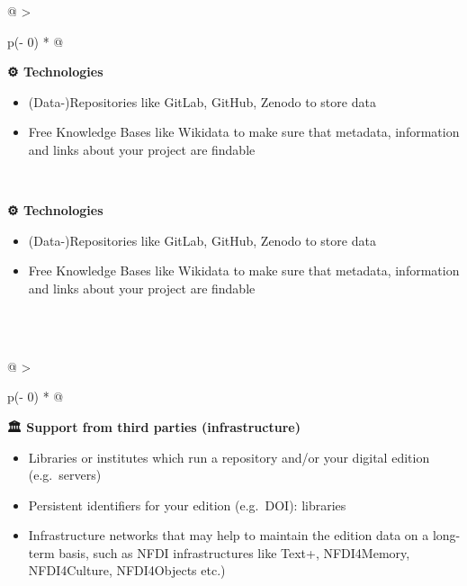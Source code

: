 \documentclass[
  letterpaper,
  DIV=11,
  numbers=noendperiod]{scrreprt}
\begin{document}
\begin{longtable}[]{@{}
  >{\raggedright\arraybackslash}p{(\columnwidth - 0\tabcolsep) * }@{}}
\caption{Figure 1. Architecture diagram, adapted from Institut für
Dokumentologie und Editorik (2019), Architekturen, slide 8.
\url{https://www.i-d-e.de/wp-content/uploads/2019/11/08_Architekturen.pdf}
(accessed 6 March 2026).}\tabularnewline
\toprule\noalign{}
\begin{minipage}[b]{\linewidth}\raggedright
\textbf{⚙️ Technologies} \textbar{}

\begin{itemize}
\item
  (Data-)Repositories like GitLab, GitHub, Zenodo to store data
\item
  Free Knowledge Bases like Wikidata to make sure that metadata,
  information and links about your project are findable
\end{itemize}
\end{minipage} \\
\midrule\noalign{}
\endfirsthead
\toprule\noalign{}
\begin{minipage}[b]{\linewidth}\raggedright
\textbf{⚙️ Technologies} \textbar{}

\begin{itemize}
\item
  (Data-)Repositories like GitLab, GitHub, Zenodo to store data
\item
  Free Knowledge Bases like Wikidata to make sure that metadata,
  information and links about your project are findable
\end{itemize}
\end{minipage} \\
\midrule\noalign{}
\endhead
\bottomrule\noalign{}
\endlastfoot
 \\
\end{longtable}

\begin{longtable}[]{@{}
  >{\raggedright\arraybackslash}p{(\columnwidth - 0\tabcolsep) * }@{}}
\toprule\noalign{}
\begin{minipage}[b]{\linewidth}\raggedright
\textbf{🏛️ Support from third parties (infrastructure)} \textbar{}

\begin{itemize}
\item
  Libraries or institutes which run a repository and/or your digital
  edition (e.g.~servers)
\item
  Persistent identifiers for your edition (e.g.~DOI): libraries
\item
  Infrastructure networks that may help to maintain the edition data on
  a long-term basis, such as NFDI infrastructures like Text+,
  NFDI4Memory, NFDI4Culture, NFDI4Objects etc.)
\end{itemize}
\end{minipage} \\
\midrule\noalign{}
\endhead
\bottomrule\noalign{}
\endlastfoot
 \\
\end{longtable}
\end{document}
